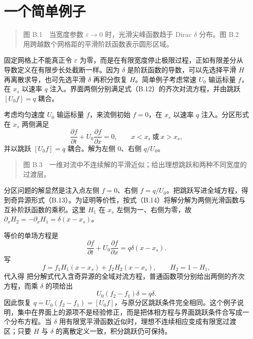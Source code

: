 \documentclass[11pt,a4paper,openany,fontset=none]{ctexbook}
\begin{document}
\section{一个简单例子}
\begin{quote}\small 图 B.1　当宽度参数 $\varepsilon\to0$ 时，光滑尖峰函数趋于 Dirac $\delta$ 分布。图 B.2　用跨越数个网格距的平滑阶跃函数表示圆形区域。\end{quote}
固定网格上不能真正令 $\varepsilon$ 为零，而是在有限宽度停止极限过程，正如有限差分从导数定义在有限步长处截断一样。因为 $\delta$ 是阶跃函数的导数，可以先选择平滑 $H$ 再离散求导，也可先选平滑 $\delta$ 再积分恢复 $H$。简单例子考虑常速 $U_0$ 输运标量 $f$，在 $x_s$ 以速率 $q$ 注入。界面两侧分别满足式（B.12）的齐次对流方程，并由跳跃 $[U_0f]=q$ 耦合。


考虑均匀速度 $U_0$ 输运标量 $f$，来流侧初始 $f=0$，在 $x_s$ 以速率 $q$ 注入。分区形式在 $x_s$ 两侧满足
\begin{equation}
 \frac{\partial f}{\partial t}+U_0\frac{\partial f}{\partial x}=0,
 \qquad x<x_s\ \text{或}\ x>x_s, \tag{B.12}
\end{equation}
并以跳跃 $[U_0f]=q$ 耦合。解为左侧 0、右侧 $q/U_0$。

\begin{quote}\small 图 B.3　一维对流中不连续解的平滑近似；给出理想跳跃和两种不同宽度的过渡层。\end{quote}
分区问题的解显然是注入点左侧 $f=0$、右侧 $f=q/U_0$。把跳跃写进全域方程，得到奇异源形式（B.13）。为证明等价性，按式（B.14）将解分解为两侧光滑函数与互补阶跃函数的乘积。这里 $H_1$ 在 $x_s$ 左侧为一、右侧为零，故 $\partial_xH_2=-\partial_xH_1=\delta(x-x_s)$。

等价的单场方程是
\begin{equation}
 \frac{\partial f}{\partial t}+U_0\frac{\partial f}{\partial x}=q\delta(x-x_s). \tag{B.13}
\end{equation}
写
\begin{equation}
 f=f_1H_1(x-x_s)+f_2H_2(x-x_s),\qquad H_2=1-H_1, \tag{B.14}
\end{equation}
代入得
把分解式代入含奇异源的全域对流方程，普通函数项分别给出两侧的齐次方程，而乘 $\delta$ 的项给出
\[
 U_0(f_2-f_1)\delta=q\delta.
\]
因此恢复 $q=U_0(f_2-f_1)=[U_0f]$，与原分区跳跃条件完全相同。这个例子说明，集中在界面上的源项不是经验修正，而是把体相方程与界面跳跃条件合写成一个分布方程。当 $\delta$ 用有限宽平滑函数近似时，理想不连续相应变成有限宽过渡区；只要 $H$ 与 $\delta$ 的离散定义一致，积分跳跃仍可保持。
\end{document}
